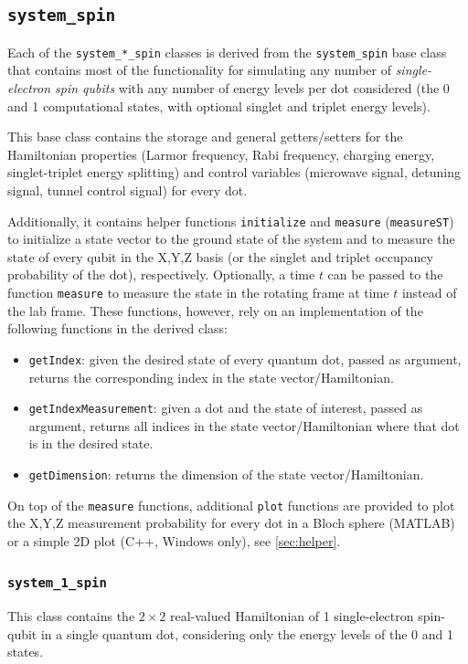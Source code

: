 \documentclass[10pt,a4paper,onecolumn,notitlepage]{article}
\begin{document}
\subsection{\lstinline{system_spin}}
\label{sec:system_spin}
Each of the \lstinline{system_*_spin} classes is derived from the \lstinline{system_spin} base class that contains most of the functionality for simulating any number of \emph{single-electron spin qubits} with any number of energy levels per dot considered (the 0 and 1 computational states, with optional singlet and triplet energy levels).

This base class contains the storage and general getters/setters for the Hamiltonian properties (Larmor frequency, Rabi frequency, charging energy, singlet-triplet energy splitting) and control variables (microwave signal, detuning signal, tunnel control signal) for every dot.

Additionally, it contains helper functions \lstinline{initialize} and \lstinline{measure} (\lstinline{measureST}) to initialize a state vector to the ground state of the system and to measure the state of every qubit in the X,Y,Z basis (or the singlet and triplet occupancy probability of the dot), respectively. Optionally, a time $t$ can be passed to the function \lstinline{measure} to measure the state in the rotating frame at time $t$ instead of the lab frame. These functions, however, rely on an implementation of the following functions in the derived class:
\begin{itemize}
	\item \lstinline{getIndex}: given the desired state of every quantum dot, passed as argument, returns the corresponding index in the state vector/Hamiltonian.
	\item \lstinline{getIndexMeasurement}: given a dot and the state of interest, passed as argument, returns all indices in the state vector/Hamiltonian where that dot is in the desired state.
	\item \lstinline{getDimension}: returns the dimension of the state vector/Hamiltonian.
\end{itemize}
On top of the \lstinline{measure} functions, additional \lstinline{plot} functions are provided to plot the X,Y,Z measurement probability for every dot in a Bloch sphere (MATLAB) or a simple 2D plot (C++, Windows only), see \cref{sec:helper}.

\subsubsection{\lstinline{system_1_spin}}
This class contains the $2\times2$ real-valued Hamiltonian of 1 single-electron spin-qubit in a single quantum dot, considering only the energy levels of the 0 and 1 states.
\end{document}
